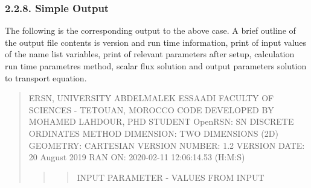\documentclass[letterpaper,10pt,english]{sphinxmanual}
\begin{document}
\noindent{}


\subsubsection{2.2.8. Simple Output}
\label{\detokenize{Guide:simple-output}}
The following is the corresponding output to the above case. A brief outline of the output file contents is version and run time information, print of input values of the name list variables, print of relevant parameters after setup, calculation run time parametres method, scalar flux solution and output parameters solution to transport equation.
\begin{quote}
\begin{quote}

\begin{sphinxVerbatim}[commandchars=\\\{\}]

\end{sphinxVerbatim}
\end{quote}

ERSN, UNIVERSITY ABDELMALEK ESSAADI FACULTY OF SCIENCES - TETOUAN, MOROCCO
CODE  DEVELOPED  BY  MOHAMED  LAHDOUR,  PHD  STUDENT
OpenRSN:         SN  DISCRETE  ORDINATES  METHOD
DIMENSION:       TWO DIMENSIONS (2D)
GEOMETRY:        CARTESIAN
VERSION NUMBER:  1.2
VERSION DATE:    20  August  2019
RAN ON:          2020-02-11 12:06:14.53   (H:M:S)
\sphinxstylestrong{****************************************************************************}
\begin{quote}
\begin{quote}

INPUT  PARAMETER - VALUES  FROM  INPUT
\end{quote}
\end{quote}


\end{quote}
\end{document}
